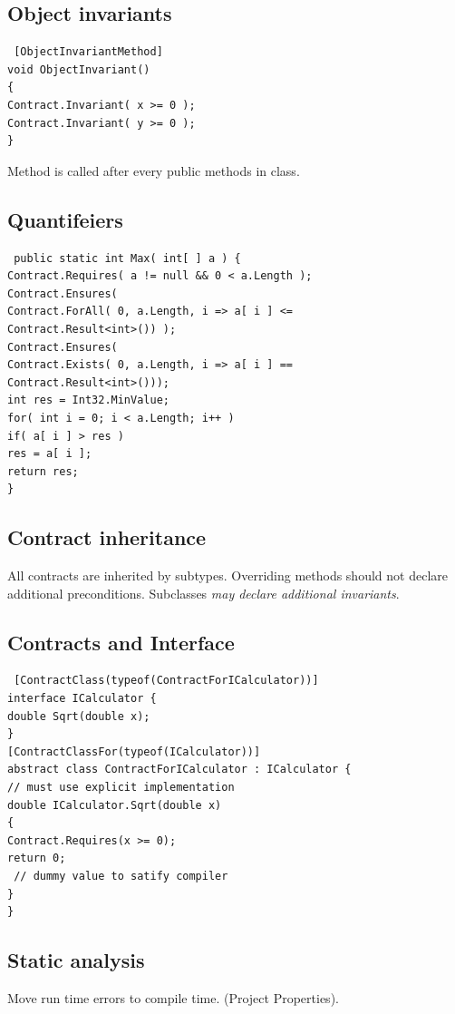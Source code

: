 \documentclass[a4paper,10pt]{scrartcl}
\begin{document}
\subsection{Object invariants}
\begin{lstlisting}
 [ObjectInvariantMethod]
void ObjectInvariant()
{
Contract.Invariant( x >= 0 );
Contract.Invariant( y >= 0 );
}

\end{lstlisting}
Method is called after every public methods in class. 

\subsection{Quantifeiers}
\begin{lstlisting}
 public static int Max( int[ ] a ) {
Contract.Requires( a != null && 0 < a.Length );
Contract.Ensures(
Contract.ForAll( 0, a.Length, i => a[ i ] <=
Contract.Result<int>()) );
Contract.Ensures(
Contract.Exists( 0, a.Length, i => a[ i ] ==
Contract.Result<int>()));
int res = Int32.MinValue;
for( int i = 0; i < a.Length; i++ )
if( a[ i ] > res )
res = a[ i ];
return res;
}

\end{lstlisting}

\subsection{Contract inheritance}
All contracts are inherited by subtypes. Overriding methods should not declare additional preconditions. Subclasses \textit{may declare additional invariants}.

\subsection{Contracts and Interface}
\begin{lstlisting}
 [ContractClass(typeof(ContractForICalculator))]
interface ICalculator {
double Sqrt(double x);
}
[ContractClassFor(typeof(ICalculator))]
abstract class ContractForICalculator : ICalculator {
// must use explicit implementation
double ICalculator.Sqrt(double x)
{
Contract.Requires(x >= 0);
return 0;
 // dummy value to satify compiler
}
}

\end{lstlisting}

\subsection{Static analysis }
Move run time errors to compile time. (Project Properties).
\end{document}
